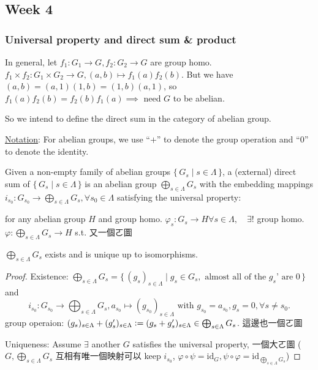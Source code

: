 \subsection{Week 4}
\subsubsection{Universal property and direct sum \& product}
In general, let $f_1: G_1 \to G, f_2: G_2 \to G$ are group homo.
$f_1 \times f_2: G_1 \times G_2 \to G, (a, b) \mapsto f_1(a)f_2(b)$.
But we have $(a, b) = (a, 1)(1, b) = (1, b)(a, 1)$, so
$f_1(a)f_2(b) = f_2(b)f_1(a) \implies $ need $G$ to be abelian.

So we intend to define the direct sum in the category of abelian group.

\underline{Notation}: For abelian groups, we use ``$+$'' to denote the group
operation and ``$0$'' to denote the identity.

\begin{definition}
  Given a non-empty family of abelian groups $\{\, G_s \mid s \in \Lambda \,\}$,
  a (external) direct sum of $\{\, G_s \mid s \in \Lambda \,\}$ is an
  abelian group $\bigoplus_{s\in \Lambda} G_s$ with the embedding mappings
  $i_{s_0}: G_{s_0} \to \bigoplus_{s\in \Lambda} G_s,
  \forall s_0 \in \Lambda$ satisfying the universal property:

  for any abelian group $H$ and group homo. $\varphi_s: G_s \to H
  \forall s \in \Lambda, \quad \exists!$ group homo. $\varphi:
  \bigoplus_{s\in \Lambda} G_s \to H$ s.t. 又一個ㄛ圖
\end{definition}

\begin{theorem}
  $\bigoplus_{s\in \Lambda} G_s$ exists and is unique up to isomorphisms.

  \begin{proof}
    Existence: $\bigoplus_{s\in \Lambda} G_s = \{\, (g_s)_{s\in \Lambda}
      \mid g_s \in G_s, \text{~almost all of the $g_s$' are $0$} \,\}$ and
      \[ i_{s_0}: G_{s_0} \to \bigoplus_{s\in \Lambda} G_s,
        a_{s_0} \mapsto (g_{s_0})_{s\in \Lambda} \text{~with~}
        g_{s_0} = a_{s_0}, g_s = 0, \forall s \ne s_0. \]
        group operaion: $(g_s)_{s \in \Lambda} + (g_s')_{s \in \Lambda}
        \vcentcolon= (g_s + g_s')_{s \in \Lambda} \in
        \bigoplus_{s\in \Lambda} G_s$.
        這邊也一個ㄛ圖

    Uniqueness: Assume $\exists$ another $G$ satisfies the universal property,
    一個大ㄛ圖 ($G, \bigoplus_{s\in \Lambda} G_s$ 互相有唯一個映射可以
    keep $i_{s_0}$, $\varphi \circ \psi = \text{id}_{G}, \psi \circ \varphi
    = \text{id}_{\bigoplus_{s\in \Lambda} G_s}$)
  \end{proof}
\end{theorem}

